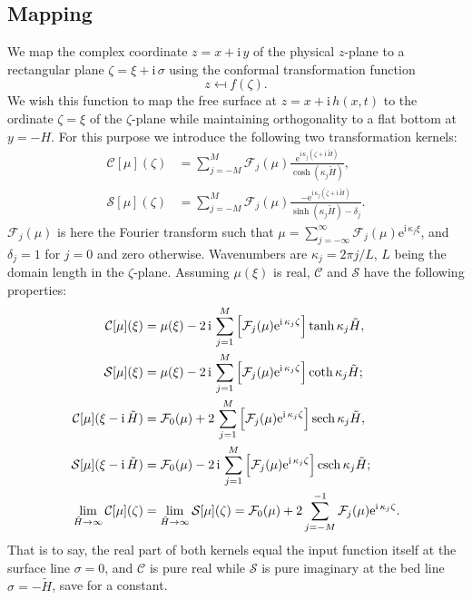 \documentclass[a4paper,12pt]{article}
\newcommand{\mr}{\mathrm}
\newcommand{\mc}{\mathcal}
\newcommand{\ii}{\mr{i}\,}
\newcommand{\ee}{\mr{e}}
\renewcommand{\_}[1]{_\mr{#1}}
\let\Re\relax
\let\Im\relax
\DeclareMathOperator\Re{Re}
\DeclareMathOperator\Im{Im}
\newcommand{\z}{z}
\newcommand{\x}{x}
\newcommand{\y}{y}
\newcommand{\zz}{\zeta}
\newcommand{\xx}{\xi}
\newcommand{\yy}{\sigma}
\newcommand{\kk}{\kappa}
\newcommand{\zmap}{f}
\newcommand{\Hz}{H}
\newcommand{\Hzz}{\tilde H}
\newcommand{\hz}{h}
\newcommand{\Lsin}{\mc S}
\newcommand{\Lcos}{\mc C}
\newcommand{\FF}{\mc F}
\DeclareMathOperator{\sech}{sech}
\DeclareMathOperator{\csch}{csch}
\begin{document}
\subsection*{Mapping}
We map the complex coordinate
$\z = \x+\ii\y$
of the physical $\z$-plane to a rectangular plane $\zz=\xx+\ii\yy$ using the conformal transformation function
\[\z\mapsfrom \zmap(\zz).\]
We wish this function to map the free surface at $\z=\x+\ii\hz(\x,t)$ to the ordinate $\zz=\xx$ of the $\zz$-plane while maintaining orthogonality to a flat bottom at $\y=-\Hz$.
For this purpose we introduce the following two transformation kernels:
\newcommand{\fun}{\mu}
\begin{subequations}
\begin{align}
\Lcos[\fun](\zz) &= \sum_{j=-M}^M \FF_j(\fun) \frac{\ee^{\ii \kk_j(\zz+\ii \Hzz)}}{\cosh(\kk_j\Hzz)},%
\label{eq:Lcos}\\
\Lsin[\fun](\zz) &= \sum_{j=-M}^M \FF_j(\fun) \frac{-\ee^{\ii \kk_j(\zz+\ii \Hzz)}}{\sinh(\kk_j\Hzz)-\delta_j}.%
\label{eq:Lsin}%
 \end{align}%
\label{eq:L}%
\end{subequations}%
$\FF_j(\fun)$ is here the Fourier transform such that $\fun=\sum_{j=-\infty}^\infty \FF_j(\fun)\ee^{\ii \kk_j \xx}$, and $\delta_j=1$ for $j=0$ and zero otherwise. 
Wavenumbers are $\kk_j=2\pi j/L$, $L$ being the domain length in the $\zeta$-plane.
Assuming $\fun(\xx)$ is real, $\Lcos$ and $\Lsin $ have the following properties:
\begin{subequations}
\begin{align}
\Lcos[\fun](\xx) &= \fun(\xx)  -2\,\ii \sum_{j=1}^M \Im\Big[\FF_j(\fun) \ee^{\ii \kk_j\zz}\Big]\tanh\kk_j\Hzz,\label{eq:LProps:C0}\\
\Lsin[\fun](\xx) &= \fun(\xx)  -2\,\ii \sum_{j=1}^M \Im\Big[\FF_j(\fun) \ee^{\ii \kk_j\zz}\Big]\coth\kk_j\Hzz;\label{eq:LProps:S0}\\
\Lcos[\fun](\xx-\ii\Hzz) &= \FF_0(\fun)  +2\,    \sum_{j=1}^M \Re\Big[\FF_j(\fun) \ee^{\ii \kk_j\zz}\Big]\sech\kk_j\Hzz,\label{eq:LProps:CH}\\
\Lsin[\fun](\xx-\ii\Hzz) &= \FF_0(\fun)  -2\,\ii \sum_{j=1}^M \Im\Big[\FF_j(\fun) \ee^{\ii \kk_j\zz}\Big]\csch\kk_j\Hzz;\label{eq:LProps:SH}\\
\lim_{\Hzz\to\infty}\Lcos[\fun](\zz) &=\lim_{\Hzz\to\infty}\Lsin[\fun](\zz)= \FF_0(\fun) + 2 \sum_{j=-M}^{-1} \FF_j(\fun) \ee^{\ii \kk_j \zz}.\label{eq:LProps:lim}
\end{align}%
\label{eq:LProps}%
\end{subequations}%
That is to say, the real part of both kernels equal the input function itself at the surface line $\yy=0$, and $\Lcos$ is pure real while $\Lsin$ is pure imaginary at the bed line $\yy = -\Hzz$, save for a constant.
\end{document}
